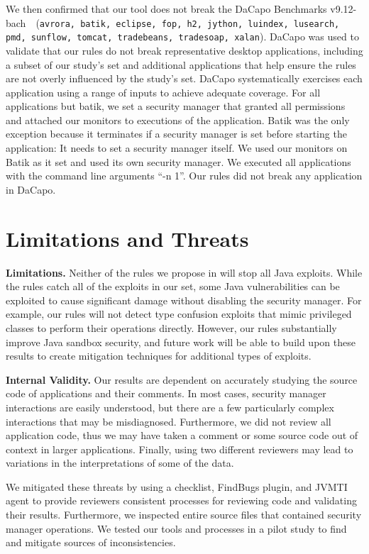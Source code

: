 \documentclass{sig-alternate}
\newcommand{\minisec}[1]{\vspace{2ex}\noindent\textbf{#1}}
\begin{document}
We then confirmed that our tool does not break the DaCapo
Benchmarks v9.12-bach~\cite{dacapo}~(\texttt{avrora, batik, eclipse, fop, h2, jython, luindex,
lusearch, pmd, sunflow, tomcat, tradebeans, tradesoap, xalan}). 
DaCapo was used to validate that our rules do not break representative desktop applications, including a subset of our study's set and additional applications that help ensure the rules are not overly influenced by the study's set. DaCapo systematically exercises each application using a range of inputs to achieve adequate coverage. For all
applications but batik, we set a security manager that granted all
permissions and attached our monitors to executions of the application. Batik was the only
exception because it terminates if a security manager is set before starting the application: It needs to set a security manager itself. We used our monitors on Batik as it set and used its
own security manager. We executed all applications with the command line arguments ``-n 1''. 
Our rules did not break any application in DaCapo.

\section{Limitations and Threats}\label{sec:Limitations}

\minisec{Limitations.}
Neither of the rules we propose in  will stop all Java exploits. While the rules
catch all of the exploits in our set, some Java vulnerabilities can
be exploited to cause significant damage without disabling the security
manager. For example, our rules will not detect type confusion exploits
that mimic privileged classes to perform their operations directly.
However, our rules substantially improve Java sandbox security, and
future work will be able to build upon these results to create mitigation
techniques for additional types of exploits.

\minisec{Internal Validity.} 
Our results are dependent on accurately studying the source code of
applications and their comments. In most cases, security manager interactions
are easily understood, but there are a few particularly complex interactions
that may be misdiagnosed. Furthermore, we did not review all application
code, thus we may have taken a comment or some source code out of
context in larger applications. Finally, using two different reviewers
may lead to variations in the interpretations of some of the data. 

We mitigated these threats by using a checklist, FindBugs plugin, and JVMTI agent to
provide reviewers consistent processes for reviewing code
and validating their results. Furthermore,
we inspected entire source files that contained
security manager operations. We tested our tools and processes in a pilot study
to find and mitigate sources of inconsistencies.
\end{document}
